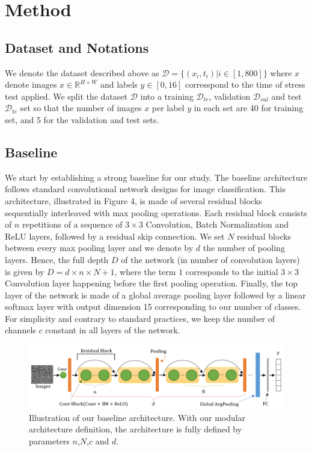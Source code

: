 \documentclass[10pt,twocolumn,letterpaper]{article}
\begin{document}
\section{Method}

\subsection{Dataset and Notations}
We denote the dataset described above as $\mathcal{D}=\{(x_i,t_i) | i \in [1,800] \}$ where $x$ denote images $x \in \mathbb{R}^{H \times W}$ and labels $y \in [0,16]$ corresspond to the time of stress test applied.
We split the dataset $\mathcal{D}$ into a training $\mathcal{D}_{tr}$, validation $\mathcal{D}_{val}$ and test $\mathcal{D}_{te}$ set so that the number of images $x$ per label $y$ in each set are 40 for training set, and 5 for the validation and test sets.

\subsection{Baseline}

We start by establishing a strong baseline for our study.
The baseline architecture follows standard convolutional network designs for image classification.
This architecture, illustrated in Figure 4, is made of several residual blocks 
sequentially interleaved with max pooling operations.
Each residual block consists of $n$ repetitions of a sequence of 
$3 \times 3$ Convolution, Batch Normalization and ReLU layers,
followed by a residual skip connection.
We set $N$ residual blocks between every max pooling layer
and we denote by $d$ the number of pooling layers.
Hence, the full depth $D$ of the network (in number of convolution layers) 
is given by $D=d \times n \times N +1$, where the term $1$ corresponds to the
initial $3 \times 3$ Convolution layer happening before the first pooling operation.
Finally, the top layer of the network is made of a global average pooling layer 
followed by a linear softmax layer with output dimension 15 corresponding to our number of classes.
For simplicity and contrary to standard practices, we keep the number of channels $c$ constant 
in all layers of the network.

\begin{figure}[h]
\centering
\includegraphics[width=0.9\linewidth]{"./figures/Figure4"}
\caption{
Illustration of our baseline architecture.
With our modular architecture definition, 
the architecture is fully defined by parameters $n$,$N$,$c$ and $d$.
}
\end{figure}
\end{document}
